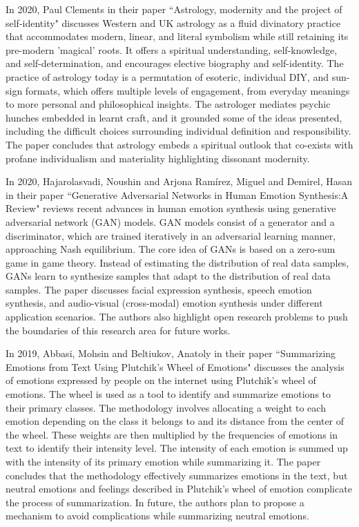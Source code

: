 In 2020, Paul Clements in their paper ``Astrology, modernity and the project of self-identity" discusses Western and UK astrology as a fluid divinatory practice that accommodates modern, linear, and literal symbolism while still retaining its pre-modern 'magical' roots. It offers a spiritual understanding, self-knowledge, and self-determination, and encourages elective biography and self-identity. The practice of astrology today is a permutation of esoteric, individual DIY, and sun-sign formats, which offers multiple levels of engagement, from everyday meanings to more personal and philosophical insights. The astrologer mediates psychic hunches embedded in learnt craft, and it grounded some of the ideas presented, including the difficult choices surrounding individual definition and responsibility. The paper concludes that astrology embeds a spiritual outlook that co-exists with profane individualism and materiality highlighting dissonant modernity\cite{doi:10.1080/14755610.2022.2093234}.
\vspace{1\baselineskip}

In 2020, Hajarolasvadi, Noushin and Arjona Ramírez, Miguel and Demirel, Hasan in their paper ``Generative Adversarial Networks in Human Emotion Synthesis:A Review" reviews recent advances in human emotion synthesis using generative adversarial network (GAN) models. GAN models consist of a generator and a discriminator, which are trained iteratively in an adversarial learning manner, approaching Nash equilibrium. The core idea of GANs is based on a zero-sum game in game theory. Instead of estimating the distribution of real data samples, GANs learn to synthesize samples that adapt to the distribution of real data samples. The paper discusses facial expression synthesis, speech emotion synthesis, and audio-visual (cross-modal) emotion synthesis under different application scenarios. The authors also highlight open research problems to push the boundaries of this research area for future works\cite{article0}.
\vspace{1\baselineskip}

In 2019, Abbasi, Mohsin and Beltiukov, Anatoly in their paper ``Summarizing Emotions from Text Using Plutchik's Wheel of Emotions" discusses the analysis of emotions expressed by people on the internet using Plutchik's wheel of emotions. The wheel is used as a tool to identify and summarize emotions to their primary classes. The methodology involves allocating a weight to each emotion depending on the class it belongs to and its distance from the center of the wheel. These weights are then multiplied by the frequencies of emotions in text to identify their intensity level. The intensity of each emotion is summed up with the intensity of its primary emotion while summarizing it. The paper concludes that the methodology effectively summarizes emotions in the text, but neutral emotions and feelings described in Plutchik's wheel of emotion complicate the process of summarization. In future, the authors plan to propose a mechanism to avoid complications while summarizing neutral emotions\cite{article3}.
\vspace{1\baselineskip}

